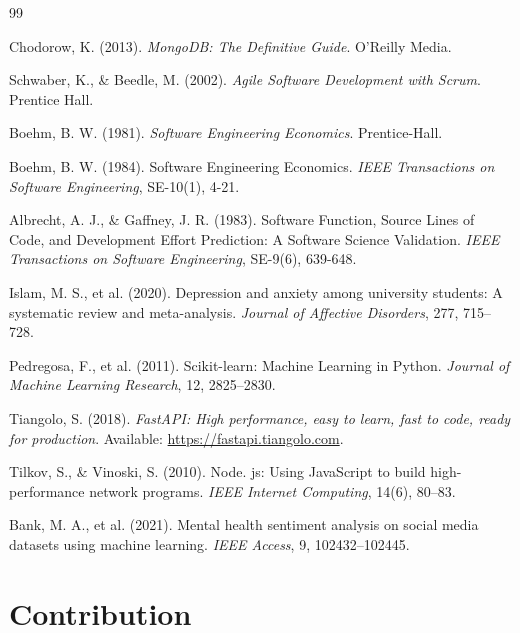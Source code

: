 \documentclass[a4paper,11pt]{report}
\begin{document}
\begin{thebibliography}{99}

Chodorow, K. (2013). \textit{MongoDB: The Definitive Guide}. O'Reilly Media.

Schwaber, K., \& Beedle, M. (2002). \textit{Agile Software Development with Scrum}. Prentice Hall.

Boehm, B. W. (1981). \textit{Software Engineering Economics}. Prentice-Hall.

Boehm, B. W. (1984). Software Engineering Economics. \textit{IEEE Transactions on Software Engineering}, SE-10(1), 4-21.

Albrecht, A. J., \& Gaffney, J. R. (1983). Software Function, Source Lines of Code, and Development Effort Prediction: A Software Science Validation. \textit{IEEE Transactions on Software Engineering}, SE-9(6), 639-648.

Islam, M. S., et al. (2020). Depression and anxiety among university students: A systematic review and meta-analysis. \textit{Journal of Affective Disorders}, 277, 715--728.

Pedregosa, F., et al. (2011). Scikit-learn: Machine Learning in Python. \textit{Journal of Machine Learning Research}, 12, 2825--2830.

Tiangolo, S. (2018). \textit{FastAPI: High performance, easy to learn, fast to code, ready for production}. Available: \url{https://fastapi.tiangolo.com}.

Tilkov, S., \& Vinoski, S. (2010). Node. js: Using JavaScript to build high-performance network programs. \textit{IEEE Internet Computing}, 14(6), 80--83.

Bank, M. A., et al. (2021). Mental health sentiment analysis on social media datasets using machine learning. \textit{IEEE Access}, 9, 102432--102445.

\end{thebibliography}

\clearpage
{}
{}
\chapter*{Contribution}
\end{document}
